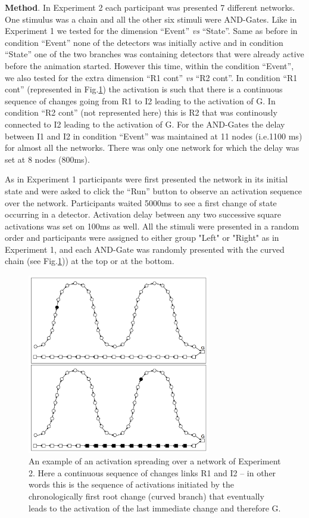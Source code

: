 \documentclass[10pt,letterpaper]{article}
\begin{document}
\textbf{Method}. In Experiment 2 each participant was presented 7 different networks. One stimulus was a chain and all the other six stimuli were AND-Gates. Like in Experiment 1 we tested for the dimension ``Event'' \textit{vs} ``State''. Same as before in condition ``Event'' none of the detectors was initially active and in condition ``State'' one of the two branches was containing detectors that were already active before the animation started. However this time, within the condition ``Event'',  we also tested for the extra dimension ``R1 cont'' \textit{vs} ``R2 cont''.  In condition ``R1 cont'' (represented in Fig.\ref{fig:3}) the activation is such that there is a continuous sequence of changes going from R1 to I2 leading to the activation of G. In condition ``R2 cont'' (not represented here) this is R2 that was continously connected to I2 leading to the activation of G. For the AND-Gates the delay between I1 and I2 in condition ``Event'' was maintained at 11 nodes (i.e.1100 ms) for almost all the networks. There was only one network for which the delay was set at 8 nodes (800ms).

As in Experiment 1 participants were first presented the network in its initial state and were asked to click the ``Run'' button to observe an activation sequence over the network. Participants waited 5000ms to see a first change of state occurring in a detector. Activation delay between any two successive square activations was set on 100ms as well. All the stimuli were presented in a random order and participants were assigned to either group "Left" or "Right" as in Experiment 1, and each AND-Gate was randomly presented with the curved chain (see Fig.\ref{fig:3})) at the top or at the bottom.

\begin{figure}[ht]
\begin{center}
\includegraphics[width=8cm]{stim_E2a}
\end{center}
\caption{An example of an activation spreading over a network of Experiment 2. Here a continuous sequence of changes links R1 and I2 -- in other words this is the sequence of activations initiated by the chronologically first root change (curved branch) that eventually leads to the activation of the last immediate change and therefore G.} 
\label{fig:3}
\end{figure}
\end{document}
